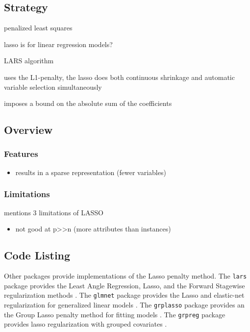 \subsection{Strategy}

penalized least squares

lasso is for linear regression models?

LARS algorithm

uses the L1-penalty, the lasso does both continuous shrinkage and automatic variable selection simultaneously

imposes a bound on the absolute sum of the coefficients

\subsection{Overview}

\subsubsection{Features}

\begin{itemize}
	\item results in a sparse representation (fewer variables)
\end{itemize}

\subsubsection{Limitations}

\cite{Zou2005} mentions 3 limitations of LASSO

\begin{itemize}
	\item not good at p>>n (more attributes than instances)
\end{itemize}


\subsection{Code Listing}


Other packages provide implementations of the Lasso penalty method.
The \texttt{lars} package provides the  Least Angle Regression, Lasso, and the Forward Stagewise regularization methods \cite{Hastie2011}.
The \texttt{glmnet} package provides the Lasso and elastic-net regularization for generalized linear models \cite{Friedman2011}.
The \texttt{grplasso} package provides an the Group Lasso penalty method for fitting models \cite{Meier2009}.
The \texttt{grpreg} package provides lasso regularization with grouped covariates \cite{Brehen2011}.


